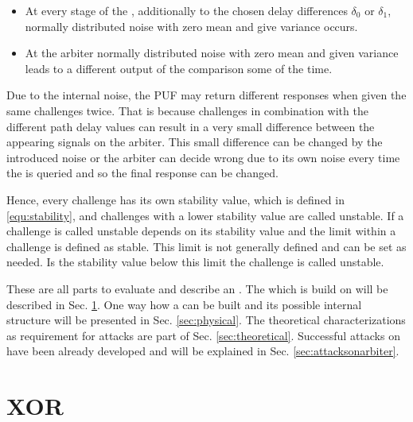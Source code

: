 \begin{itemize}
\item At every stage of the \apuf, additionally to the chosen delay differences $\delta_0$ or $\delta_1$, normally distributed noise with zero mean and give variance occurs.
\item At the arbiter normally distributed noise with zero mean and given variance leads to a different output of the comparison some of the time.
\end{itemize}

Due to the internal noise, the PUF may return different responses when given the same challenges twice.
That is because challenges in combination with the different path delay values can result in a very small difference between the appearing signals on the arbiter. %
This small difference can be changed by the introduced noise or the arbiter can decide wrong due to its own noise every time the \apuf is queried and so the final response can be changed. %

Hence, every challenge has its own stability value, which is defined in \ref{equ:stability}, and challenges with a lower stability value are called unstable.
If a challenge is called unstable depends on its stability value and the limit within a challenge is defined as stable.
This limit is not generally defined and can be set as needed.
Is the stability value below this limit the challenge is called unstable.

These are all parts to evaluate and describe an \apuf.
The \xpuf which is build on \apufs will be described in Sec. \ref{sec:xorarbiterpufs}.
One way how a \apuf can be built and its possible internal structure will be presented in Sec. \ref{sec:physical}.
The theoretical characterizations as requirement for attacks are part of Sec. \ref{sec:theoretical}.
Successful attacks on \apufs have been already developed and will be explained in Sec. \ref{sec:attacksonarbiter}.


\section{\acs{XOR} \apufs}
\label{sec:xorarbiterpufs}

